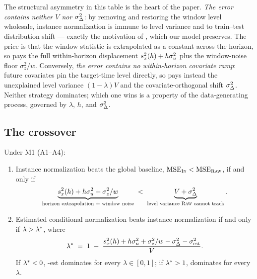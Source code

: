The structural asymmetry in this table is the heart of the paper. \emph{The \inm{} error contains neither $V$ nor $\sigma_\Delta^2$}: by removing and restoring the window level wholesale, instance normalization is immune to level variance and to train--test distribution shift --- exactly the motivation of \citet{kim2022revin}, which our model preserves. The price is that the window statistic is extrapolated as a constant across the horizon, so \inm{} pays the full within-horizon displacement $s_x^2(h) + h\sigma_u^2$ plus the window-noise floor $\sigma_z^2/w$. Conversely, \emph{the \cnm{} error contains no within-horizon covariate ramp}: future covariates pin the target-time level directly, so \cnm{} pays instead the unexplained level variance $(1-\lambda)V$ and the covariate-orthogonal shift $\sigma_\Delta^2$. Neither strategy dominates; which one wins is a property of the data-generating process, governed by $\lambda$, $h$, and $\sigma_\Delta^2$.

\subsection{The crossover}

\setcounter{proposition}{1}
\begin{proposition}\label{prop:crossover}
Under M1 (A1--A4):
\begin{enumerate}
  \item[(i)] Instance normalization beats the global baseline,
  $\mathrm{MSE}_{\textsc{In}} < \mathrm{MSE}_{\textsc{Raw}}$, if and only if
  \begin{equation}\label{eq:inraw}
    \underbrace{s_x^2(h) + h\sigma_u^2 + \sigma_z^2/w}_{\text{horizon extrapolation + window noise}}
    \;<\;
    \underbrace{V + \sigma_\Delta^2}_{\text{level variance \textsc{Raw}{} cannot track}} .
  \end{equation}
  \item[(ii)] Estimated conditional normalization beats instance
  normalization if and only if $\lambda > \lambda^{*}$, where
  \begin{equation}\label{eq:lamstar}
    \lambda^{*} \;=\; 1 \;-\; \frac{s_x^2(h) + h\sigma_u^2 + \sigma_z^2/w - \sigma_\Delta^2 - \sigma_{\mathrm{est}}^2}{V} .
  \end{equation}
  If $\lambda^{*} < 0$, \cnm{}-est dominates \inm{} for every $\lambda \in [0,1]$; if $\lambda^{*} > 1$, \inm{} dominates for every $\lambda$.
\end{enumerate}
\end{proposition}

